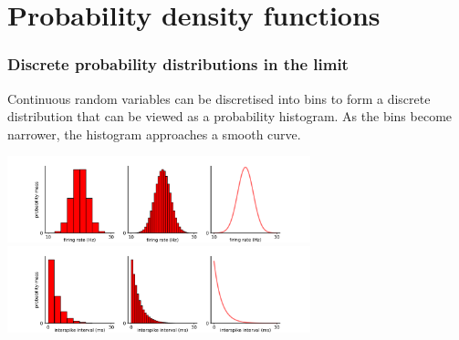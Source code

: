\documentclass[9pt]{beamer}
\begin{document}
\section{Probability density functions}
\begin{frame}
\frametitle{Discrete probability distributions in the limit} %


Continuous random variables can be discretised into bins to form a discrete distribution that can be viewed as a probability histogram. As the bins become narrower, the histogram approaches a smooth curve.

\center \includegraphics[height=2.5cm]{images/normal_mass_to_hist.png}
\vspace{-0.25cm}
\center \includegraphics[height=2.5cm]{images/exp_mass_to_hist.png}

\end{frame}


\end{document}
